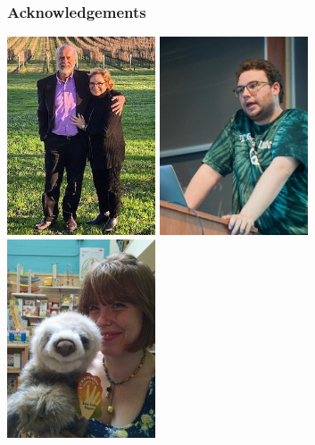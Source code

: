 \documentclass{beamer}
\begin{document}
\begin{frame}
  \frametitle{Acknowledgements}
  \centering
  \includegraphics[width=0.33\textwidth,height=\textheight,keepaspectratio=true]{figure/family/lex_timmy_anniversary_edit}
  \includegraphics[width=0.33\textwidth,height=\textheight,keepaspectratio=true]{figure/family/james_edit}
  \includegraphics[width=0.33\textwidth,height=\textheight,keepaspectratio=true]{figure/family/megan_1_edit}
\end{frame}
\end{document}
